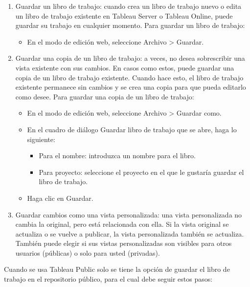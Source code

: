 \documentclass[
]{book}
\providecommand{\tightlist}{%
  \setlength{\itemsep}{0pt}\setlength{\parskip}{0pt}}
\begin{document}
\begin{enumerate}
\def\labelenumi{\arabic{enumi}.}
\tightlist
\item
  Guardar un libro de trabajo: cuando crea un libro de trabajo nuevo o edita un libro de trabajo existente en Tableau Server o Tableau Online, puede guardar su trabajo en cualquier momento. Para guardar un libro de trabajo:

  \begin{itemize}
  \tightlist
  \item
    En el modo de edición web, seleccione Archivo \textgreater{} Guardar.
  \end{itemize}
\item
  Guardar una copia de un libro de trabajo: a veces, no desea sobrescribir una vista existente con sus cambios. En casos como estos, puede guardar una copia de un libro de trabajo existente. Cuando hace esto, el libro de trabajo existente permanece sin cambios y se crea una copia para que pueda editarlo como desee. Para guardar una copia de un libro de trabajo:

  \begin{itemize}
  \tightlist
  \item
    En el modo de edición web, seleccione Archivo \textgreater{} Guardar como.
  \item
    En el cuadro de diálogo Guardar libro de trabajo que se abre, haga lo
    siguiente:

    \begin{itemize}
    \tightlist
    \item
      Para el nombre: introduzca un nombre para el libro.
    \item
      Para proyecto: seleccione el proyecto en el que le gustaría guardar
      el libro de trabajo.
    \end{itemize}
  \item
    Haga clic en Guardar.
  \end{itemize}
\item
  Guardar cambios como una vista personalizada: una vista personalizada no cambia la original, pero está relacionada con ella. Si la vista original se actualiza o se vuelve a publicar, la vista personalizada también se actualiza. También puede elegir si sus vistas personalizadas son visibles para otros usuarios (públicas) o solo para usted (privadas).
\end{enumerate}

Cuando se usa Tableau Public solo se tiene la opción de guardar el libro de trabajo en el repositorio público, para el cual debe seguir estos pasos:
\end{document}
